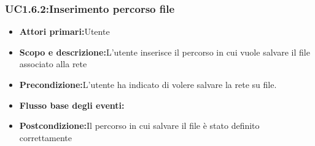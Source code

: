 \subsubsection{UC1.6.2:Inserimento percorso file}
\begin{itemize}
	\item{\textbf{Attori primari:}Utente}
	\item{\textbf{Scopo e descrizione:}L'utente inserisce il percorso in cui vuole salvare il file associato alla rete}
	\item{\textbf{Precondizione:}L'utente ha indicato di volere salvare la rete su file.}
	\item{\textbf{Flusso base degli eventi:}}
	\item{\textbf{Postcondizione:}Il percorso in cui salvare il file è stato definito correttamente}
\end{itemize}